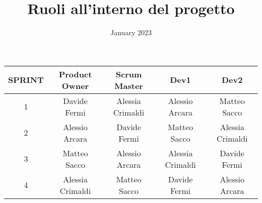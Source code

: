 \documentclass{article}
\title{Ruoli all'interno del progetto}
\date{January 2023}
\begin{document}
    \maketitle

    \begin{center}
        \begin{tabular}{ |c|c|c|c|c| }
            \hline
            SPRINT & Product Owner    & Scrum Master     & Dev1             & Dev2             \\
            \hline
            1      & Davide Fermi     & Alessia Crimaldi & Alessio Arcara   & Matteo Sacco     \\
            \hline
            2      & Alessio Arcara   & Davide Fermi     & Matteo Sacco     & Alessia Crimaldi \\
            \hline
            3      & Matteo Sacco     & Alessio Arcara   & Alessia Crimaldi & Davide Fermi     \\
            \hline
            4      & Alessia Crimaldi & Matteo Sacco     & Davide Fermi     & Alessio Arcara   \\
            \hline
        \end{tabular}
    \end{center}
\end{document}
